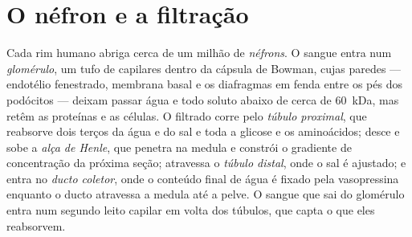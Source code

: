 \section{O néfron e a filtração}

\begin{definition}[O néfron]\label{def:b3:renal-osmoregulation:nephron}
Cada rim humano abriga cerca de um milhão de \emph{néfrons}. O sangue
entra num \emph{glomérulo}, um tufo de capilares dentro da cápsula de
Bowman, cujas paredes --- endotélio fenestrado, membrana basal e os
diafragmas em fenda entre os pés dos podócitos --- deixam passar água e
todo soluto abaixo de cerca de \qty{60}{kDa}, mas retêm as proteínas e
as células. O filtrado corre pelo \emph{túbulo proximal}, que reabsorve
dois terços da água e do sal e toda a glicose e os aminoácidos; desce e
sobe a \emph{alça de Henle}, que penetra na medula e constrói o
gradiente de concentração da próxima seção; atravessa o \emph{túbulo
distal}, onde o sal é ajustado; e entra no \emph{ducto coletor}, onde o
conteúdo final de água é fixado pela vasopressina enquanto o ducto
atravessa a medula até a pelve. O sangue que sai do glomérulo entra num
segundo leito capilar em volta dos túbulos, que capta o que eles
reabsorvem.
\end{definition}

